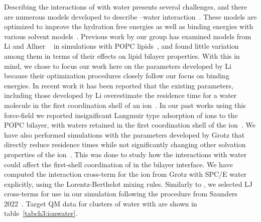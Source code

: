 Describing the interactions of \mg with water presents several challenges, and there are numerous
models developed to describe \mg--water interaction~\cite{merzparams,villaparams,microparams}.
These models are optimized to improve the hydration free energies as well as
binding energies with various solvent models~\cite{merzparams,villaparams,microparams}.  
Previous work by our group has examined \mg models
from Li \etal{} and Allner \etal{}~\cite{merzparams,villaparams} in simulations with POPC lipids~\cite{kruczek:2019}, 
and found little variation among them in terms of their effects on lipid bilayer properties. 
With this in mind, we chose to focus our work here on the parameters developed by Li \etal{} because
their optimization procedures closely follow our focus on binding energies.
In recent work it has been reported that the existing \mg parameters, 
including those developed by Li \etal{}
overestimate the residence time for a water molecule in the 
first coordination shell of an ion~\cite{microparams}. 
In our past works using this force-field we reported 
insignificant Langmuir type adsorption of \mg ions to the POPC bilayer,
with waters retained in the first coordination shell of the ion~\cite{kruczek:2019}. 
We have also performed simulations with the parameters developed by Grotz \etal{} that directly
reduce residence times while not significantly changing other solvation 
properties of the ion~\cite{grotz:2021:optimized,microparams}. 
This was done to study how the interactions with water
could affect the first-shell coordination of \mg in the bilayer interface. 
We have {computed} 
the interaction cross-term for the \mg ion from Grotz \etal{}
with SPC/E water explicitly, using {the Lorentz-Berthelot mixing rules.}
Similarly to \li{}, we selected LJ cross-terms for use in our simulation following the procedure from Saunders \etal{} 2022~\cite{saunders:2022}. Target QM data for clusters of water with \mg are shown in table~\ref{tabch3:ionwater}.
